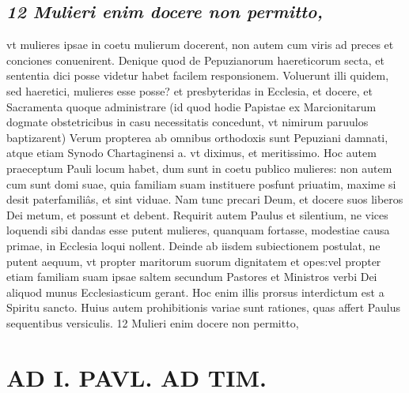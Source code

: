 \documentclass{article}
\begin{document}
\begin{pages}
\subsection*{\textit{12 Mulieri enim docere non permitto,}}vt mulieres ipsae in coetu mulierum docerent, non autem cum viris ad preces et conciones conuenirent. Denique quod de Pepuzianorum haereticorum secta, et sententia dici posse videtur habet facilem responsionem. Voluerunt illi quidem, sed haeretici, mulieres esse posse? et presbyteridas in Ecclesia, et docere, et Sacramenta quoque administrare (id quod hodie Papistae ex Marcionitarum dogmate obstetricibus in casu necessitatis concedunt, vt nimirum paruulos baptizarent) Verum propterea ab omnibus orthodoxis sunt Pepuziani damnati, atque etiam Synodo Chartaginensi a. vt diximus, et meritissimo. Hoc autem praeceptum Pauli locum habet, dum sunt in coetu publico mulieres: non autem cum sunt domi suae, quia familiam suam instituere posfunt priuatim, maxime si desit paterfamiliâs, et sint viduae. Nam tunc precari Deum, et docere suos liberos Dei metum, et possunt et debent. Requirit autem Paulus et silentium, ne vices loquendi sibi dandas esse putent mulieres, quanquam fortasse, modestiae causa primae, in Ecclesia loqui nollent. Deinde ab iisdem subiectionem postulat, ne putent aequum, vt propter maritorum suorum dignitatem et opes:vel propter etiam familiam suam ipsae saltem secundum Pastores et Ministros verbi Dei aliquod munus Ecclesiasticum gerant. Hoc enim illis prorsus interdictum est a Spiritu sancto. Huius autem prohibitionis variae sunt rationes, quas affert Paulus sequentibus  versiculis. 12 Mulieri enim docere non permitto,  \pend
\section*{AD I. PAVL. AD TIM. }
\marginpar{[ p.84 ]}\pstart {}
{}

\end{pages}
\end{document}
